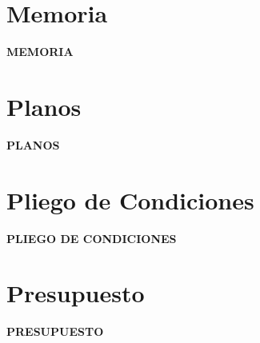 \documentclass[11pt, a4paper]{article}
\begin{document}


\setlength{\parindent}{0cm}


\newpage
\tableofcontents
\clearpage
\listoffigures 
\clearpage


\part{Memoria}
\label{sec:Memoria}
\begin{center}
\vspace*{2cm}
{\Huge \bfseries MEMORIA}
\end{center}
\pagebreak




 
\newpage

\part{Planos} 
\begin{center}
\vspace*{2cm}
{\Huge \bfseries PLANOS}
\end{center}
\pagebreak



 

\newpage

\part{Pliego de Condiciones} 
\begin{center}
\vspace*{2cm}
{\Huge \bfseries PLIEGO DE CONDICIONES}
\end{center}
\pagebreak






\newpage
\part{Presupuesto} 
\begin{center}
\vspace*{2cm}
{\Huge \bfseries PRESUPUESTO}
\end{center}
\pagebreak


\end{document}

